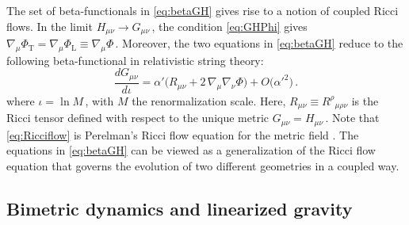 \documentclass[11pt]{article}
\newcommand{\be}{\begin{equation}}
\newcommand{\ee}{\end{equation}}
\begin{document}
The set of beta-functionals in \eqref{eq:betaGH} gives rise to a notion of coupled Ricci flows. In the limit $H_{\mu\nu} \rightarrow G_{\mu\nu}$\,, the condition \eqref{eq:GHPhi} gives $\nabla_{\!\mu}\Phi_\text{T} = \nabla_{\!\mu} \Phi_\text{L} \equiv \nabla_{\!\mu} \Phi$\,. Moreover, the two equations in \eqref{eq:betaGH} reduce to the following beta-functional in relativistic string theory:
%
\be \label{eq:Ricciflow}
	\frac{dG_{\mu\nu}}{d\iota} = \alpha' \bigl( R_{\mu\nu} + 2 \, \nabla_{\!\mu} \nabla_{\!\nu} \Phi \bigr) + O\bigl( {\alpha'}^2 \bigr)\,.
\ee
%
where $\iota = \ln M$\,, with $M$ the renormalization scale. Here, $R_{\mu\nu} \equiv R^\rho{}_{\mu\rho\nu}$ is the Ricci tensor defined with respect to the unique metric $G_{\mu\nu} = H_{\mu\nu}$\,. Note that \eqref{eq:Ricciflow} is Perelman's Ricci flow equation for the metric field \cite{Perelman:2006un}. The equations in \eqref{eq:betaGH} can be viewed as a generalization of the Ricci flow equation that governs the evolution of two different geometries in a coupled way.

\subsection{Bimetric dynamics and linearized gravity} \label{sec:lg}
\end{document}
